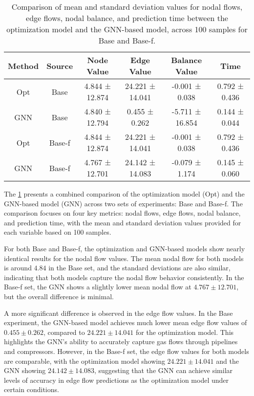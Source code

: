 \begin{table}
    \centering
    \begin{tabular}{|c|c|c|c|c|c|}
        \hline
        Method & Source & Node Value & Edge Value & Balance Value & Time \\ \hline
        Opt & Base   & 4.844 ± 12.874 & 24.221 ± 14.041 & -0.001 ± 0.038 & 0.792 ± 0.436 \\ \hline
        GNN & Base   & 4.840 ± 12.794 & 0.455 ± 0.262   & -5.711 ± 16.854 & 0.144 ± 0.044 \\ \hline
        Opt & Base-f & 4.844 ± 12.874 & 24.221 ± 14.041 & -0.001 ± 0.038 & 0.792 ± 0.436 \\ \hline
        GNN & Base-f & 4.767 ± 12.701 & 24.142 ± 14.083 & -0.079 ± 1.174  & 0.145 ± 0.060 \\ \hline
    \end{tabular}
    \caption{Comparison of mean and standard deviation values for nodal flows, edge flows, nodal balance, and prediction time between the optimization model and the GNN-based model, across 100 samples for Base and Base-f.}
    \label{tab:combined_results}
\end{table}


The \cref{tab:combined_results} presents a combined comparison of the optimization model (Opt) and the GNN-based model (GNN) across two sets of experiments: Base and Base-f. The comparison focuses on four key metrics: nodal flows, edge flows, nodal balance, and prediction time, with the mean and standard deviation values provided for each variable based on 100 samples.

For both Base and Base-f, the optimization and GNN-based models show nearly identical results for the nodal flow values. The mean nodal flow for both models is around \(4.84\) in the Base set, and the standard deviations are also similar, indicating that both models capture the nodal flow behavior consistently. In the Base-f set, the GNN shows a slightly lower mean nodal flow at \(4.767 \pm 12.701\), but the overall difference is minimal.

A more significant difference is observed in the edge flow values. In the Base experiment, the GNN-based model achieves much lower mean edge flow values of \(0.455 \pm 0.262\), compared to \(24.221 \pm 14.041\) for the optimization model. This highlights the GNN's ability to accurately capture gas flows through pipelines and compressors. However, in the Base-f set, the edge flow values for both models are comparable, with the optimization model showing \(24.221 \pm 14.041\) and the GNN showing \(24.142 \pm 14.083\), suggesting that the GNN can achieve similar levels of accuracy in edge flow predictions as the optimization model under certain conditions.

